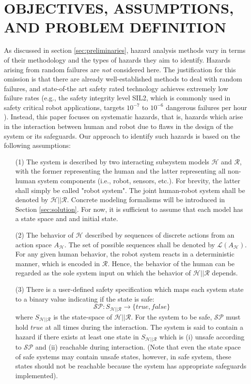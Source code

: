 \documentclass[letterpaper, 10 pt, conference]{ieeeconf}  %
\begin{document}
\section{OBJECTIVES, ASSUMPTIONS, AND PROBLEM DEFINITION}
As discussed in section \ref{sec:preliminaries}, hazard analysis methods vary in terms of their methodology and the types of hazards they aim to identify. Hazards arising from random failures are \textit{not} considered here. The justification for this omission is that there are already well-established methods to deal with random failures, and state-of-the art safety rated technology achieves extremely low failure rates (e.g., the safety integrity level SIL2, which is commonly used in safety critical robot applications, targets $10^{-7}$ to $10^{-6}$ dangerous failures per hour \cite{STD_IEC61508}). Instead, this paper focuses on systematic hazards, that is, hazards which arise in the interaction between human and robot due to flaws in the design of the system or its safeguards. Our approach to identify such hazards is based on the following assumptions:
\begin{itemize}
    \item[(1)] The system is described by two interacting subsystem models $\mathcal{H}$ and $\mathcal{R}$, with the former representing the human and the latter representing all non-human system components (i.e., robot, sensors, etc.). For brevity, the latter shall simply be called "robot system". The joint human-robot system shall be denoted by $\mathcal{H} || \mathcal{R}$. Concrete modeling formalisms will be introduced in Section \ref{sec:solution}. For now, it is sufficient to assume that each model has a state space and and initial state.
    \item[(2)] The behavior of $\mathcal{H}$ described by sequences of discrete actions from an action space $A_\mathcal{H}$. The set of possible sequences shall be denoted by $\mathcal{L}(A_\mathcal{H})$. For any given human behavior, the robot system reacts in a deterministic manner, which is encoded in $\mathcal{R}$. Hence, the behavior of the human can be regarded as the sole system input on which the behavior of $\mathcal{H} || \mathcal{R}$ depends.
    \item[(3)] There is a user-defined safety specification which maps each system state to a binary value indicating if the state is safe:
    \begin{equation}\mathcal{{SP}}: S_{\mathcal{H} || \mathcal{R}} \rightarrow \{true,false\}\end{equation}
    where $S_{\mathcal{H} || \mathcal{R}}$ is the state-space of $\mathcal{H} || \mathcal{R}$. For the system to be safe, $\mathcal{SP}$ must hold $true$ at all times during the interaction. The system is said to contain a hazard if there exists at least one state in $S_{\mathcal{H} || \mathcal{R}}$ which is (i) unsafe according to $\mathcal{SP}$ and (ii) reachable during interaction. (Note that even the state space of safe systems may contain unsafe states, however, in safe system, these states should not be reachable because the system has appropriate safeguards implemented).
\end{itemize}
\end{document}
